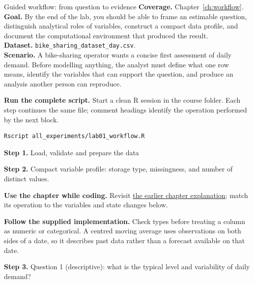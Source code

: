 
\begin{labproject}{Guided workflow: from question to evidence}
\textbf{Coverage.} Chapter~\ref{ch:workflow}.\\
\textbf{Goal.} By the end of the lab, you should be able to frame an estimable question, distinguish analytical roles of variables, construct a compact data profile, and document the computational environment that produced the result.\\
\textbf{Dataset.} \texttt{bike\_sharing\_dataset\_day.csv}.\\
\textbf{Scenario.} A bike-sharing operator wants a concise first assessment of daily demand. Before modelling anything, the analyst must define what one row means, identify the variables that can support the question, and produce an analysis another person can reproduce.



\textbf{Run the complete script.} Start a clean R session in the course folder. Each step continues the same file; comment headings identify the operation performed by the next block.
\begin{lstlisting}[style=utpterminal]
Rscript all_experiments/lab01_workflow.R
\end{lstlisting}

\noindent\textbf{Step 1.} Load, validate and prepare the data


\noindent\textbf{Step 2.} Compact variable profile: storage type, missingness, and number of distinct values.



\textbf{Use the chapter while coding.} Revisit \hyperref[ch:workflow]{the earlier chapter explanation}; match its operation to the variables and state changes below.

\textbf{Follow the supplied implementation.} Check types before treating a column as numeric or categorical. A centred moving average uses observations on both sides of a date, so it describes past data rather than a forecast available on that date.




\noindent\textbf{Step 3.} Question 1 (descriptive): what is the typical level and variability of daily demand?



\end{labproject}
